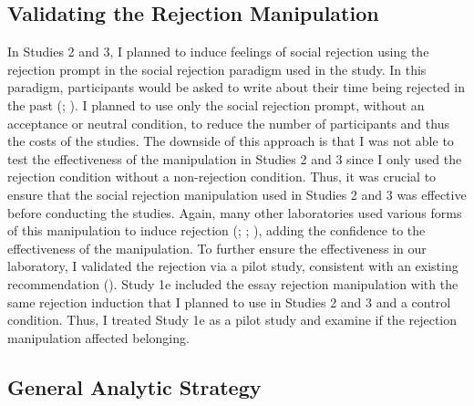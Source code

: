 \documentclass[
]{udthesis}
\begin{document}
\subsection{Validating the Rejection Manipulation}\label{validating-the-rejection-manipulation}

In Studies 2 and 3, I planned to induce feelings of social rejection
using the rejection prompt in the social rejection paradigm used in the
study. In this paradigm, participants would be asked to write about
their time being rejected in the past (; ).
I planned to use only the social rejection prompt, without an acceptance
or neutral condition, to reduce the number of participants and thus the
costs of the studies. The downside of this approach is that I was not
able to test the effectiveness of the manipulation in Studies 2 and 3
since I only used the rejection condition without a non-rejection
condition. Thus, it was crucial to ensure that the social rejection
manipulation used in Studies 2 and 3 was effective before conducting the
studies. Again, many other laboratories used various forms of this
manipulation to induce rejection (; ; ), adding the confidence to the
effectiveness of the manipulation. To further ensure the effectiveness
in our laboratory, I validated the rejection via a pilot study,
consistent with an existing recommendation
(). Study 1e included the essay
rejection manipulation with the same rejection induction that I planned
to use in Studies 2 and 3 and a control condition. Thus, I treated Study
1e as a pilot study and examine if the rejection manipulation affected
belonging.

\subsection{General Analytic Strategy}\label{general-analytic-strategy}
\end{document}
